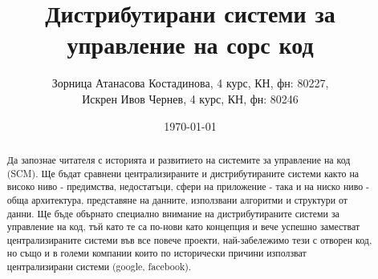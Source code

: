 \documentclass[a4paper]{article}
\def\SCM{SCM}
\begin{document}
\title{Дистрибутирани системи за управление на сорс код}
\author{
Зорница Атанасова Костадинова, 4 курс, КН, фн: 80227, \\
Искрен Ивов Чернев, 4 курс, КН, фн: 80246
}
\date{\today}
\maketitle

\begin{abstract}
Да запознае читателя с историята и развитието на системите за управление на код (\SCM). Ще бъдат сравнени централизираните и дистрибутираните системи както на високо ниво - предимства, недостатъци, сфери на приложение - така и на ниско ниво - обща архитектура, представяне на данните, използвани алгоритми и структури от данни. Ще бъде обърнато специално внимание на дистрибутираните системи за управление на код, тъй като те са по-нови като концепция и вече успешно заместват централизираните системи във все повече проекти, най-забележимо тези с отворен код, но също и в големи компании които по исторически причини използват централизирани системи (google, facebook).
\end{abstract}
\newpage

\setcounter{tocdepth}{2}
\tableofcontents
\newpage

% 
% 
% 
% 
% 
% 
% 
\end{document}
